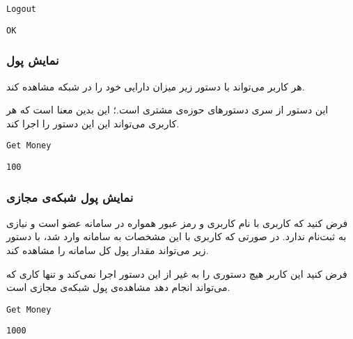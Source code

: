 \documentclass{utap}
\begin{document}
    \begin{latin}
        \begin{Verbatim}[frame=lines,label={\rl{دستور ورودی}}]
Logout
        \end{Verbatim}
        \begin{Verbatim}[frame=lines,label={\rl{خروجی}}]
OK
        \end{Verbatim}
    \end{latin}

    \subsubsection{نمایش پول}

    هر کاربر می‌تواند با دستور زیر میزان دارایی خود را در شبکه مشاهده کند.

    این دستور از سری دستورهای حوزه‌ی مشتری است.؛ این بدین معنا است که هر کاربری می‌تواند این این دستور را اجرا کند.‌

    \begin{latin}
        \begin{Verbatim}[frame=lines,label={\rl{دستور ورودی}}]
Get Money
        \end{Verbatim}
        \begin{Verbatim}[frame=lines,label={\rl{خروجی}}]
100
        \end{Verbatim}
    \end{latin}

    \subsubsection{نمایش پول شبکه‌ی مجازی}

    فرض کنید که کاربری با نام کاربری  و رمز عبور  همواره در سامانه عضو است و نیازی به ثبت‌نام ندارد. در صورتی که کاربری با این مشخصات به سامانه وارد شد، با دستور زیر می‌تواند مقدار پول کل سامانه را مشاهده کند.

    فرض کنید این کاربر هیچ دستوری را به غیر از این دستور اجرا نمی‌کند و تنها کاری که می‌تواند انجام دهد مشاهده‌ی پول شبکه‌ی مجازی است.

    \begin{latin}
        \begin{Verbatim}[frame=lines,label={\rl{دستور ورودی}}]
Get Money
        \end{Verbatim}
        \begin{Verbatim}[frame=lines,label={\rl{خروجی}}]
1000
        \end{Verbatim}
    \end{latin}
\end{document}
